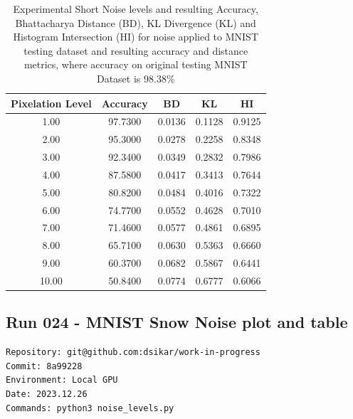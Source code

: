 \begin{table}[ht]
\centering
\begin{tabular}{|c|c|c|c|c|}
\hline
Pixelation Level & Accuracy & BD & KL & HI \\
\hline

1.00 & 97.7300 & 0.0136 & 0.1128 & 0.9125 \\
2.00 & 95.3000 & 0.0278 & 0.2258 & 0.8348 \\
3.00 & 92.3400 & 0.0349 & 0.2832 & 0.7986 \\
4.00 & 87.5800 & 0.0417 & 0.3413 & 0.7644 \\
5.00 & 80.8200 & 0.0484 & 0.4016 & 0.7322 \\
6.00 & 74.7700 & 0.0552 & 0.4628 & 0.7010 \\
7.00 & 71.4600 & 0.0577 & 0.4861 & 0.6895 \\
8.00 & 65.7100 & 0.0630 & 0.5363 & 0.6660 \\
9.00 & 60.3700 & 0.0682 & 0.5867 & 0.6441 \\
10.00 & 50.8400 & 0.0774 & 0.6777 & 0.6066 \\

\hline
\end{tabular}
\caption{Experimental Short Noise levels and resulting Accuracy, Bhattacharya Distance (BD), KL Divergence (KL) and Histogram Intersection (HI) for noise applied to MNIST testing dataset and resulting accuracy and distance metrics, where accuracy on original testing MNIST Dataset is 98.38\%}
\label{tbl-pixelation-levels}
\end{table}


\subsection{Run 024 - MNIST Snow Noise plot and table}
\label{app_res:024}
\begin{verbatim}
Repository: git@github.com:dsikar/work-in-progress
Commit: 8a99228
Environment: Local GPU
Date: 2023.12.26
Commands: python3 noise_levels.py
\end{verbatim}


